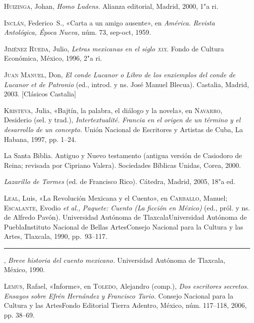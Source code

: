 \documentclass[14pt,twoside,final]{extbook} %
\begin{document}
\textsc{Huizinga}, Johan, \emph{Homo Ludens.} Alianza editorial, Madrid, 2000, 1"a ri.\label{bib:huizinga2000}

\textsc{Inclán}, Federico~S., «Carta a un amigo ausente», en \emph{América. Revista Antológica, Época Nueva,} núm. 73, sep-oct, 1959.\label{bib:inclan1959}

\textsc{Jiménez Rueda}, Julio, \emph{Letras mexicanas en el siglo \textsc{xix}.} Fondo de Cultura Económica, México, 1996, 2"a ri.\label{bib:jimenez1996}

\textsc{Juan Manuel}, Don, \emph{El conde Lucanor o Libro de los enxiemplos del conde de Lucanor et de Patronio} (ed., introd. y ns. José Manuel Blecua). Castalia, Madrid, 2003. [Clásicos Castalia]\label{bib:juanmanuel2003}

\textsc{Kristeva}, Julia, «Bajtín, la palabra, el diálogo y la novela», en \textsc{Navarro}, Desiderio (sel. y trad.), \emph{Intertextualité. Francia en el origen de un término y el desarrollo de un concepto.} Unión Nacional de Escritores y Artistas de Cuba, La Habana, 1997, pp. 1--24.\label{bib:kristeva1997}

La Santa Biblia. Antiguo y Nuevo testamento (antigua versión de Casiodoro de Reina; revisada por Cipriano Valera). Sociedades Bíblicas Unidas, Corea, 2000.\label{bib:biblia2000}

\emph{Lazarillo de Tormes} (ed. de Francisco Rico). Cátedra, Madrid, 2005, 18"a ed.\label{bib:lazarillo2005}

\textsc{Leal}, Luis, «La Revolución Mexicana y el Cuento», en \textsc{Carballo}, Manuel; \textsc{Escalante}, Evodio \emph{et al.,} \emph{Paquete: Cuento (La ficción en México)} (ed., pról. y ns. de Alfredo Pavón). Universidad Autónoma de Tlaxcala Universidad Autónoma de Puebla Instituto Nacional de Bellas Artes Consejo Nacional para la Cultura y las Artes, Tlaxcala, 1990, pp.~93--117.\label{bib:leal1990a}

\rule{1cm}{0.4pt}, \emph{Breve historia del cuento mexicano.} Universidad Autónoma de Tlaxcala, México, 1990.\label{bib:leal1990b}

\textsc{Lemus}, Rafael, «Informe», en \textsc{Toledo}, Alejandro (comp.), \emph{Dos escritores secretos. Ensayos sobre Efrén Hernández y Francisco Tario.} Consejo Nacional para la Cultura y las Artes Fondo Editorial Tierra Adentro, México, núm. 117--118, 2006, pp. 38--69.\label{bib:lemus2006}
\end{document}
